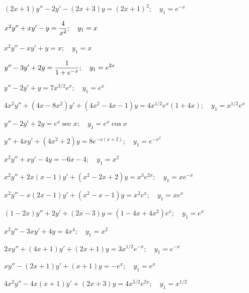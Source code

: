 \begin{exerciselist}
  \item\label{exer:5.6.1} $(2x+1)y''-2y'-(2x+3)y=(2x+1)^{2};\quad y_{1}=e^{-x}$

  \item\label{exer:5.6.2} $x^{2}y''+xy'-y=\displaystyle\frac{4}{x^{2}};\quad y_{1}=x$

  \item\label{exer:5.6.3} $x^{2}y''-xy'+y=x;\quad y_{1}=x$

  \item\label{exer:5.6.4} $y''-3y'+2y=\displaystyle\frac{1}{1+e^{-x}};\quad y_{1}=e^{2x}$

  \item\label{exer:5.6.5} $y''-2y'+y=7x^{3/2}e^{x};\quad y_{1}=e^{x}$

  \item\label{exer:5.6.6}
        $4x^{2}y''+(4x-8x^{2})y'+(4x^{2}-4x-1)y=4x^{1/2}e^{x}(1+4x);\quad y_{1}=x^{1/2}e^{x}$

  \item\label{exer:5.6.7} $y''-2y'+2y=e^{x}\sec x;\quad y_{1}=e^{x}\cos x$

  \item\label{exer:5.6.8} $y''+4xy'+(4x^{2}+2)y=8e^{-x(x+2)};\quad y_{1}=e^{-x^{2}}$

  \item\label{exer:5.6.9} $x^{2}y''+xy'-4y=-6x-4;\quad y_{1}=x^{2}$

  \item\label{exer:5.6.10} $x^{2}y''+2x(x-1)y'+(x^{2}-2x+2)y=x^{3}e^{2x};\quad y_{1}=xe^{-x}$

  \item\label{exer:5.6.11} $x^{2}y''-x(2x-1)y'+(x^{2}-x-1)y=x^{2}e^{x};\quad y_{1}=xe^{x}$

  \item\label{exer:5.6.12} $(1-2x)y''+2y'+(2x-3)y=(1-4x+4x^{2})e^{x};\quad y_{1}=e^{x}$

  \item\label{exer:5.6.13} $x^{2}y''-3xy'+4y=4x^{4};\quad y_{1}=x^{2}$

  \item\label{exer:5.6.14} $2xy''+(4x+1)y'+(2x+1)y=3x^{1/2}e^{-x};\quad y_{1}=e^{-x}$

  \item\label{exer:5.6.15} $xy''-(2x+1)y'+(x+1)y=-e^{x};\quad y_{1}=e^{x}$

  \item\label{exer:5.6.16} $4x^{2}y''-4x(x+1)y'+(2x+3)y=4x^{5/2}e^{2x};\quad y_{1}=x^{1/2}$


\end{exerciselist}
